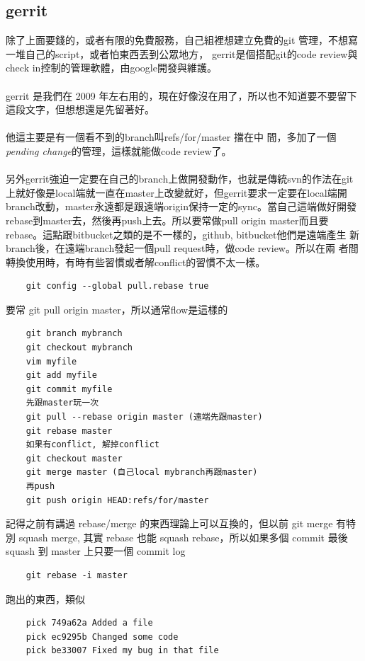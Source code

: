   \subsection{gerrit}
    除了上面要錢的，或者有限的免費服務，自己組裡想建立免費的git 管理，不想寫
    一堆自己的script，或者怕東西丟到公眾地方，
    gerrit是個搭配git的code review與check in控制的管理軟體，由google開發與維護。
    \\\\
    gerrit 是我們在 2009 年左右用的，現在好像沒在用了，所以也不知道要不要留下
    這段文字，但想想還是先留著好。
    \\\\
    他這主要是有一個看不到的branch叫refs/for/master 擋在中
    間，多加了一個 \emph{pending change}的管理，這樣就能做code review了。
    \\\\
    另外gerrit強迫一定要在自己的branch上做開發動作，也就是傳統svn的作法在git
    上就好像是local端就一直在master上改變就好，但gerrit要求一定要在local端開
    branch改動，master永遠都是跟遠端origin保持一定的sync。當自己這端做好開發
    rebase到master去，然後再push上去。所以要常做pull origin master而且要
    rebase。這點跟bitbucket之類的是不一樣的，github, bitbucket他們是遠端產生
    新branch後，在遠端branch發起一個pull request時，做code review。所以在兩
    者間轉換使用時，有時有些習慣或者解conflict的習慣不太一樣。
    \begin{verbatim}
    git config --global pull.rebase true
    \end{verbatim}
    要常 git pull origin master，所以通常flow是這樣的
    \begin{verbatim}
    git branch mybranch
    git checkout mybranch
    vim myfile
    git add myfile
    git commit myfile
    先跟master玩一次
    git pull --rebase origin master (遠端先跟master)
    git rebase master
    如果有conflict, 解掉conflict
    git checkout master
    git merge master (自己local mybranch再跟master)
    再push
    git push origin HEAD:refs/for/master
    \end{verbatim}
    記得之前有講過 rebase/merge 的東西理論上可以互換的，但以前 git merge 有特別
    squash merge, 其實 rebase 也能 squash rebase，所以如果多個 commit 最後 
    squash 到 master 上只要一個 commit log
    \begin{verbatim}
    git rebase -i master
    \end{verbatim}
    跑出的東西，類似
    \begin{verbatim}
    pick 749a62a Added a file
    pick ec9295b Changed some code
    pick be33007 Fixed my bug in that file
    \end{verbatim}
